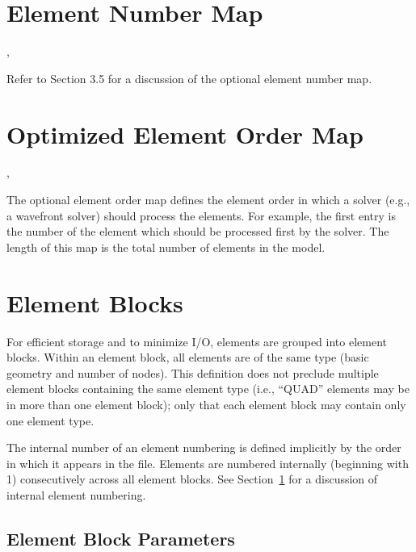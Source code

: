 \section{Element Number Map}\label{s:enm}

\begin{spacing}{1.5}
\api {}, 


\end{spacing}

{Refer to  Section 3.5 for a discussion of the optional element 
number map.}




\section{Optimized Element Order Map}\label{s:eom}

\begin{spacing}{1.5}
\api {}, 


\end{spacing}

The optional element order map defines the element order in which a
solver (e.g., a wavefront solver) should process the elements. For
example, the first entry is the number of the element which should be
processed first by the solver. The length of this map is the total
number of elements in the model.

\section{Element Blocks}

For efficient storage and to minimize I/O, elements are grouped into
element blocks. Within an element block, all elements are of the same
type (basic geometry and number of nodes). This definition does not
preclude multiple element blocks containing the same element type
(i.e., ``QUAD'' elements may be in more than one element block); only
that each element block may contain only one element type.

The internal number of an element numbering is defined implicitly by
the order in which it appears in the file. Elements are numbered
internally (beginning with 1) consecutively across all element
blocks. See Section~\ref{s:enm} for a discussion of internal element
numbering.

\subsection{Element Block Parameters}\label{s:ebp}

